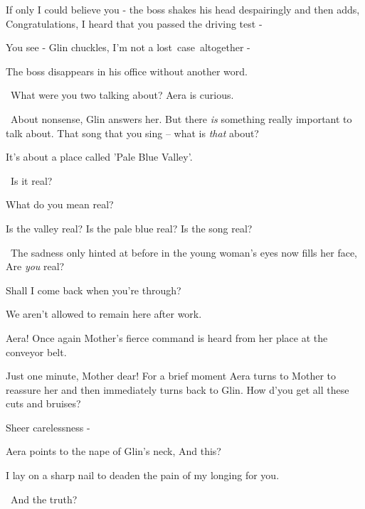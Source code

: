 \documentclass[twoside,11pt]{book}
\begin{document}
{{\textquotedbl}If only I could believe you -{\textquotedbl} the boss shakes his head despairingly and
then adds, {\textquotedbl}Congratulations, I heard that you passed the driving test - {\textquotedbl}}

{{\textquotedbl}You see -{\textquotedbl} Glin chuckles, {\textquotedbl}I'm not a lost\ case\ altogether
-{\textquotedbl}}

{The boss disappears in his office without another word.\ }

{\ }{\textquotedbl}What were you two talking about?{\textquotedbl} Aera is curious.

~{\textquotedbl}About nonsense,{\textquotedbl} Glin answers her. {\textquotedbl}But there \textit{is} something really
important to talk about. That song that you sing -- what is \textit{that} about?{\textquotedbl} 

{\textquotedbl}It's about a place called 'Pale Blue Valley'.{\textquotedbl}

~{\textquotedbl}Is it real?{\textquotedbl}

{\textquotedbl}What do you mean real?{\textquotedbl}

{\textquotedbl}Is the valley real? Is the pale blue real? Is the song real?{\textquotedbl}

~The sadness only hinted at before in the young woman's eyes now fills her face, {\textquotedbl}Are \textit{you}
real?{\textquotedbl} 

{\textquotedbl}Shall I come back when you're through?{\textquotedbl}

{\textquotedbl}We aren't allowed to remain here after work.{\textquotedbl}

{\textquotedbl}Aera!{\textquotedbl} Once again Mother's fierce command is heard from her place at the conveyor belt.\ 

{\textquotedbl}Just one minute, Mother dear!{\textquotedbl} For a brief moment\MakeUppercase{ a}era turns to Mother to
reassure her and then immediately turns back to Glin. {\textquotedbl}How d'you get all these cuts and
bruises?{\textquotedbl} 

{\textquotedbl}Sheer carelessness -{\textquotedbl}

Aera points to the nape of Glin's neck, {\textquotedbl}And this?{\textquotedbl}

{\textquotedbl}I lay on a sharp nail to deaden the pain of my longing for you.{\textquotedbl}

~{\textquotedbl}And the truth?{\textquotedbl} 
\end{document}
